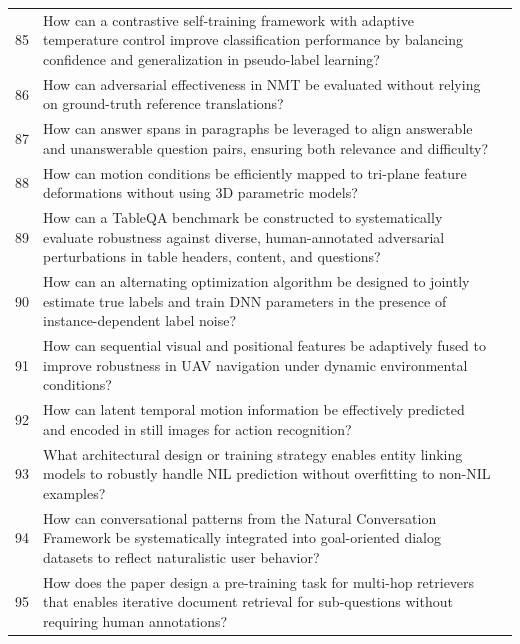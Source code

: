 \begin{longtable}{@{}p{0.5cm}p{7.2cm}p{2.5cm}@{}}
85 & How can a contrastive self-training framework with adaptive temperature control improve classification performance by balancing confidence and generalization in pseudo-label learning? & \cite{10.18653/v1/2024.eacl-long.39} \\
86 & How can adversarial effectiveness in NMT be evaluated without relying on ground-truth reference translations? & \cite{10.18653/v1/2021.acl-long.153} \\
87 & How can answer spans in paragraphs be leveraged to align answerable and unanswerable question pairs, ensuring both relevance and difficulty? & \cite{10.18653/v1/n19-1415} \\
88 & How can motion conditions be efficiently mapped to tri-plane feature deformations without using 3D parametric models? & \cite{10.1609/aaai.v38i7.28473} \\
89 & How can a TableQA benchmark be constructed to systematically evaluate robustness against diverse, human-annotated adversarial perturbations in table headers, content, and questions? & \cite{10.18653/v1/2023.acl-long.334} \\
90 & How can an alternating optimization algorithm be designed to jointly estimate true labels and train DNN parameters in the presence of instance-dependent label noise? & \cite{10.1609/aaai.v35i11.17221} \\
91 & How can sequential visual and positional features be adaptively fused to improve robustness in UAV navigation under dynamic environmental conditions? & \cite{10.1609/aaai.v38i9.28906} \\
92 & How can latent temporal motion information be effectively predicted and encoded in still images for action recognition? & \cite{10.1609/aaai.v34i03.5653} \\
93 & What architectural design or training strategy enables entity linking models to robustly handle NIL prediction without overfitting to non-NIL examples? & \cite{10.18653/v1/2023.findings-acl.690} \\
94 & How can conversational patterns from the Natural Conversation Framework be systematically integrated into goal-oriented dialog datasets to reflect naturalistic user behavior? & \cite{10.18653/v1/2020.findings-emnlp.358} \\
95 & How does the paper design a pre-training task for multi-hop retrievers that enables iterative document retrieval for sub-questions without requiring human annotations? & \cite{10.18653/v1/2021.findings-acl.62} \\

\end{longtable}
